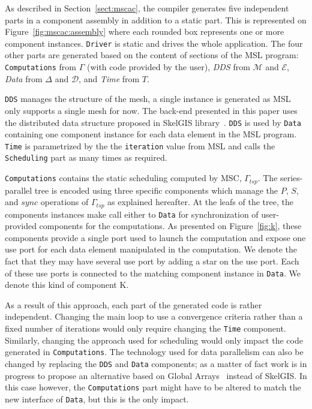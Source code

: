 As described in Section~\ref{sect:mscac}, the compiler generates five independent parts in a component assembly in addition to a static part.
This is represented on Figure~\ref{fig:mscac:assembly} where each rounded box represents one or more component instances.
\texttt{Driver} is static and drives the whole application.
The four other parts are generated based on the content of sections of the MSL program: \texttt{Computations} from $\Gamma$ (with code provided by the user), \emph{DDS} from $\mathcal{M}$ and $\mathcal{E}$, \emph{Data} from $\Delta$ and $\mathcal{D}$, and \emph{Time} from $T$.

\texttt{DDS} manages the structure of the mesh, a single instance is generated as MSL only supports a single mesh for now.
The back-end presented in this paper uses the distributed data structure proposed in SkelGIS library~\cite{CPE:CPE3494}.
\texttt{DDS} is used by \texttt{Data} containing one component instance for each data element in the MSL program.
\texttt{Time} is parametrized by the the \texttt{iteration} value from MSL and calls the \texttt{Scheduling} part as many times as required.

\texttt{Computations} contains the static scheduling computed by MSC, \ie $\Gamma_{tsp}$.
The series-parallel tree is encoded using three specific components which manage the $P$, $S$, and $sync$ operations of $\Gamma_{tsp}$ as explained hereafter.
At the leafs of the tree, the components instances make call either to \texttt{Data} for synchronization of user-provided components for the computations.
As presented on Figure~\ref{fig:k}, these components provide a single port used to launch the computation and expose one use port for each data element manipulated in the computation.
We denote the fact that they may have several use port by adding a star on the use port.
Each of these use ports is connected to the matching component instance in \texttt{Data}.
We denote this kind of component K.

As a result of this approach, each part of the generated code is rather independent.
Changing the main loop to use a convergence criteria rather than a fixed number of iterations would only require changing the \texttt{Time} component.
Similarly, changing the approach used for scheduling would only impact the code generated in \texttt{Computations}.
The technology used for data parallelism can also be changed by replacing the \texttt{DDS} and \texttt{Data} components; as a matter of fact work is in progress to propose an alternative based on Global Arrays~\cite{Nieplocha:2006:AAP:1125980.1125985} instead of SkelGIS.
In this case however, the \texttt{Computations} part might have to be altered to match the new interface of \texttt{Data}, but this is the only impact.

